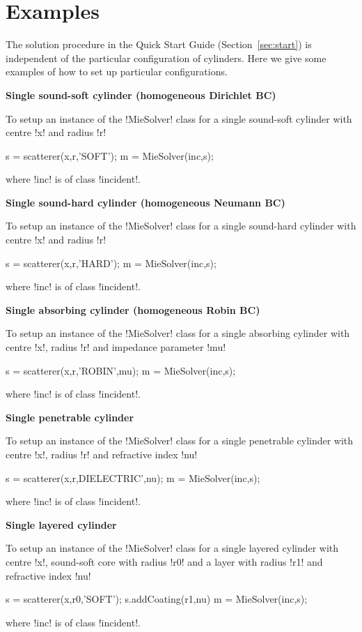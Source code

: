 \documentclass[11pt,letterpaper]{article}
\newcommand{\techheading}[1]{%
    \par\vspace{-0.3\parskip}\noindent\hspace{-1cm}\textbf{#1}%
    \par\vspace{-0.5\parskip}\noindent\nopagebreak\ignorespaces}
\begin{document}
\section{Examples}
\label{sec:examples}

The solution procedure in the Quick Start Guide (Section~\ref{sec:start})
is independent of the particular configuration of cylinders.
Here we give some examples of how to set up particular configurations.

\techheading{Single sound-soft cylinder (homogeneous Dirichlet BC)}
To setup an instance of the !MieSolver! class for
a single sound-soft cylinder with centre !x! and radius !r!
\begin{matlab}
s = scatterer(x,r,'SOFT');
m = MieSolver(inc,s);
\end{matlab}
where !inc! is of class !incident!.

\techheading{Single sound-hard cylinder (homogeneous Neumann BC)}
To setup an instance of the !MieSolver! class for
a single sound-hard cylinder with centre !x! and radius !r!
\begin{matlab}
s = scatterer(x,r,'HARD');
m = MieSolver(inc,s);
\end{matlab}
where !inc! is of class !incident!.

\techheading{Single absorbing cylinder (homogeneous Robin BC)}
To setup an instance of the !MieSolver! class for
a single absorbing cylinder with centre !x!, radius !r!
and impedance parameter !mu!
\begin{matlab}
s = scatterer(x,r,'ROBIN',mu);
m = MieSolver(inc,s);
\end{matlab}
where !inc! is of class !incident!.

\techheading{Single penetrable cylinder}
To setup an instance of the !MieSolver! class for
a single penetrable cylinder with centre !x!, radius !r!
and refractive index !nu!
\begin{matlab}
s = scatterer(x,r,DIELECTRIC',nu);
m = MieSolver(inc,s);
\end{matlab}
where !inc! is of class !incident!.

\techheading{Single layered cylinder}
To setup an instance of the !MieSolver! class for
a single layered cylinder with centre !x!, sound-soft core with radius !r0!
and a layer with radius !r1! and refractive index !nu!
\begin{matlab}
s = scatterer(x,r0,'SOFT');
s.addCoating(r1,nu)
m = MieSolver(inc,s);
\end{matlab}
where !inc! is of class !incident!.
\end{document}
